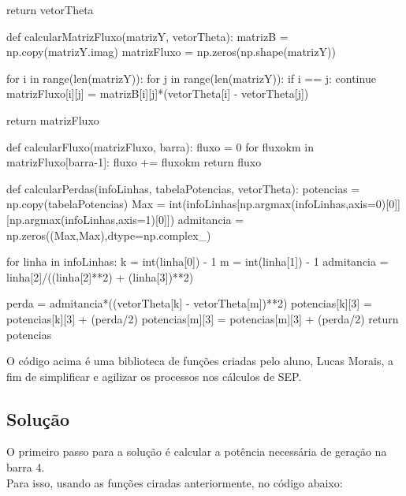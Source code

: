\begin{python}
    return vetorTheta 

def calcularMatrizFluxo(matrizY, vetorTheta):
    matrizB = np.copy(matrizY.imag)
    matrizFluxo = np.zeros(np.shape(matrizY))

    for i in range(len(matrizY)):
        for j in range(len(matrizY)):
            if i == j: continue
            matrizFluxo[i][j] = matrizB[i][j]*(vetorTheta[i] - vetorTheta[j])

    return matrizFluxo 

def calcularFluxo(matrizFluxo, barra):
    fluxo = 0
    for fluxokm in matrizFluxo[barra-1]:
        fluxo += fluxokm
    return fluxo

def calcularPerdas(infoLinhas, tabelaPotencias, vetorTheta):
    potencias = np.copy(tabelaPotencias)
    Max = int(infoLinhas[np.argmax(infoLinhas,axis=0)[0]][np.argmax(infoLinhas,axis=1)[0]])
    admitancia = np.zeros((Max,Max),dtype=np.complex_)

    for linha in infoLinhas: 
        k = int(linha[0]) - 1
        m = int(linha[1]) - 1
        admitancia = linha[2]/((linha[2]**2) + (linha[3])**2)

        perda = admitancia*((vetorTheta[k] - vetorTheta[m])**2) 
        potencias[k][3] = potencias[k][3] + (perda/2) 
        potencias[m][3] = potencias[m][3] + (perda/2) 
    return potencias
\end{python}

O código acima é uma biblioteca de funções criadas pelo aluno, Lucas Morais, a fim de simplificar e agilizar os processos nos cálculos de SEP.\\

\subsection{Solução}

O primeiro passo para a solução é calcular a potência necessária de geração na barra 4.\\

Para isso, usando as funções ciradas anteriormente, no código abaixo:\\

